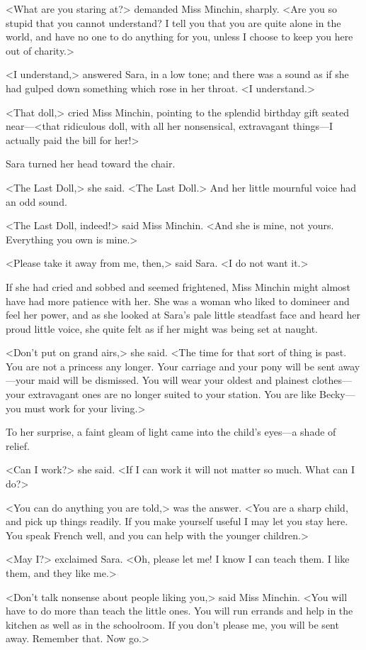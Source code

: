 <What are you staring at?> demanded Miss Minchin, sharply. <Are you so stupid that you cannot understand? I tell you that you are quite alone in the world, and have no one to do anything for you, unless I choose to keep you here out of charity.>

<I understand,> answered Sara, in a low tone; and there was a sound as if she had gulped down something which rose in her throat. <I understand.>

<That doll,> cried Miss Minchin, pointing to the splendid birthday gift seated near—<that ridiculous doll, with all her nonsensical, extravagant things—I actually paid the bill for her!>

Sara turned her head toward the chair.

<The Last Doll,> she said. <The Last Doll.> And her little mournful voice had an odd sound.

<The Last Doll, indeed!> said Miss Minchin. <And she is mine, not yours. Everything you own is mine.>

<Please take it away from me, then,> said Sara. <I do not want it.>

If she had cried and sobbed and seemed frightened, Miss Minchin might almost have had more patience with her. She was a woman who liked to domineer and feel her power, and as she looked at Sara's pale little steadfast face and heard her proud little voice, she quite felt as if her might was being set at naught.

<Don't put on grand airs,> she said. <The time for that sort of thing is past. You are not a princess any longer. Your carriage and your pony will be sent away—your maid will be dismissed. You will wear your oldest and plainest clothes—your extravagant ones are no longer suited to your station. You are like Becky—you must work for your living.>

To her surprise, a faint gleam of light came into the child's eyes—a shade of relief.

<Can I work?> she said. <If I can work it will not matter so much. What can I do?>

<You can do anything you are told,> was the answer. <You are a sharp child, and pick up things readily. If you make yourself useful I may let you stay here. You speak French well, and you can help with the younger children.>

<May I\@?> exclaimed Sara. <Oh, please let me! I know I can teach them. I like them, and they like me.>

<Don't talk nonsense about people liking you,> said Miss Minchin. <You will have to do more than teach the little ones. You will run errands and help in the kitchen as well as in the schoolroom. If you don't please me, you will be sent away. Remember that. Now go.>

